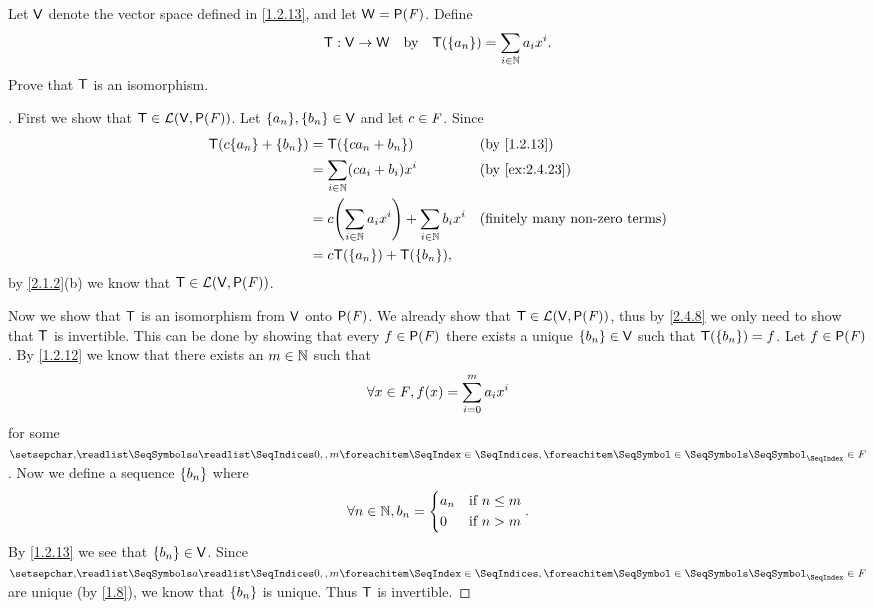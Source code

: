 \begin{ex}\label{ex:2.4.23}
  Let \(\mathsf{V}\) denote the vector space defined in \cref{1.2.13}, and let \(\W = \ps{\F}\).
  Define
  \[
    \mathsf{T} : \mathsf{V} \to \mathsf{W} \quad \text{by} \quad \mathsf{T}(\left\lbrace a_n\right\rbrace) = \sum_{i \in \mathbb{N}} a_i x^i.
  \]
  Prove that \(\mathsf{T}\) is an isomorphism.
\end{ex}

\begin{proof}[]
  First we show that \(\T \in \ls(\V, \ps{\F})\).
  Let \(\set{a_n}, \set{b_n} \in \V\) and let \(c \in \mathit{F}\).
  Since
  \begin{align*}
    \T(c \set{a_n} + \set{b_n}) & = \T(\set{c a_n + b_n})                                    &  & \text{(by \cref{1.2.13})}             \\
                                & = \sum_{i \in \N} (c a_i + b_i) x^i                        &  & \text{(by \cref{ex:2.4.23})}          \\
                                & = c \pa{\sum_{i \in \N} a_i x^i} + \sum_{i \in \N} b_i x^i &  & \text{(finitely many non-zero terms)} \\
                                & = c \T(\set{a_n}) + \T(\set{b_n}),
  \end{align*}
  by \cref{2.1.2}(b) we know that \(\T \in \ls(\V, \ps{\F})\).

  Now we show that \(\mathsf{T}\) is an isomorphism from \(\mathsf{V}\) onto \(\ps{\F}\).
  We already show that \(\T \in \ls(\V, \ps{\F})\), thus by \cref{2.4.8} we only need to show that \(\mathsf{T}\) is invertible.
  This can be done by showing that every \(f \in \ps{\F}\) there exists a unique \(\left\lbrace b_n\right\rbrace \in \mathsf{V}\) such that \(\mathsf{T}(\left\lbrace b_n\right\rbrace) = f\).
  Let \(f \in \ps{\F}\).
  By \cref{1.2.12} we know that there exists an \(m \in \mathbb{N}\) such that
  \[
    \forall x \in \mathit{F}, f(x) = \sum_{i = 0}^m a_i x^i
  \]
  for some \(\seq{a}{0,,m} \in \F\).
  Now we define a sequence \(\left\lbrace b_n\right\rbrace\) where
  \[
    \forall n \in \mathbb{N}, b_n = \begin{dcases}
      a_n & \text{if } n \leq m \\
      0   & \text{if } n > m
    \end{dcases}.
  \]
  By \cref{1.2.13} we see that \(\left\lbrace b_n\right\rbrace \in \mathsf{V}\).
  Since \(\seq{a}{0,,m} \in \F\) are unique (by \cref{1.8}), we know that \(\left\lbrace b_n\right\rbrace\) is unique.
  Thus \(\mathsf{T}\) is invertible.
\end{proof}

